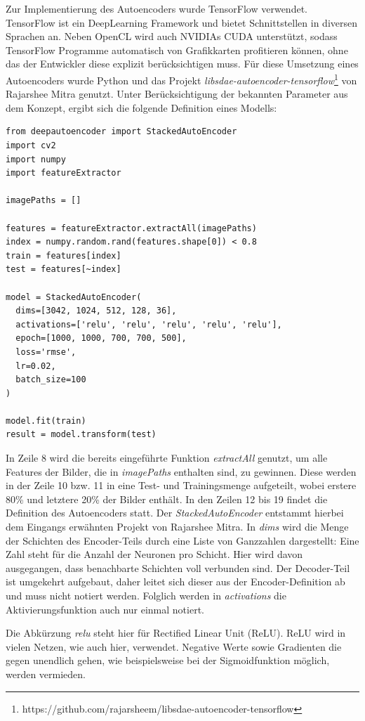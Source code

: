 Zur Implementierung des Autoencoders wurde TensorFlow verwendet. TensorFlow ist ein DeepLearning Framework und bietet Schnittstellen in diversen Sprachen an. Neben OpenCL wird auch NVIDIAs CUDA unterstützt, sodass TensorFlow Programme automatisch von Grafikkarten profitieren können, ohne das der Entwickler diese explizit berücksichtigen muss. Für diese Umsetzung eines Autoencoders wurde Python und das Projekt \textit{libsdae-autoencoder-tensorflow}\footnote{https://github.com/rajarsheem/libsdae-autoencoder-tensorflow} von Rajarshee Mitra genutzt. Unter Berücksichtigung der bekannten Parameter aus dem Konzept, ergibt sich die folgende Definition eines Modells:

\lstset{language=Python}
\begin{lstlisting}
from deepautoencoder import StackedAutoEncoder
import cv2
import numpy
import featureExtractor

imagePaths = []

features = featureExtractor.extractAll(imagePaths)
index = numpy.random.rand(features.shape[0]) < 0.8
train = features[index]
test = features[~index]

model = StackedAutoEncoder(
  dims=[3042, 1024, 512, 128, 36],
  activations=['relu', 'relu', 'relu', 'relu', 'relu'], 
  epoch=[1000, 1000, 700, 700, 500], 
  loss='rmse', 
  lr=0.02, 
  batch_size=100
)

model.fit(train)
result = model.transform(test)
\end{lstlisting}

In Zeile 8 wird die bereits eingeführte Funktion \textit{extractAll} genutzt, um alle Features der Bilder, die in \textit{imagePaths} enthalten sind, zu gewinnen. Diese werden in der Zeile 10 bzw. 11 in eine Test- und Trainingsmenge aufgeteilt, wobei erstere 80\% und letztere 20\% der Bilder enthält.
In den Zeilen 12 bis 19 findet die Definition des Autoencoders statt. Der \textit{StackedAutoEncoder} entstammt hierbei dem Eingangs erwähnten Projekt von Rajarshee Mitra. In \textit{dims} wird die Menge der Schichten des Encoder-Teils durch eine Liste von Ganzzahlen dargestellt: Eine Zahl steht für die Anzahl der Neuronen pro Schicht. Hier wird davon ausgegangen, dass benachbarte Schichten voll verbunden sind. Der Decoder-Teil ist umgekehrt aufgebaut, daher leitet sich dieser aus der Encoder-Definition ab und muss nicht notiert werden. Folglich werden in \textit{activations} die Aktivierungsfunktion auch nur einmal notiert. 

Die Abkürzung \textit{relu} steht hier für Rectified Linear Unit (ReLU). ReLU wird in vielen Netzen, wie auch hier, verwendet. Negative Werte sowie Gradienten die gegen unendlich gehen, wie beispielsweise bei der Sigmoidfunktion möglich, werden vermieden. 

